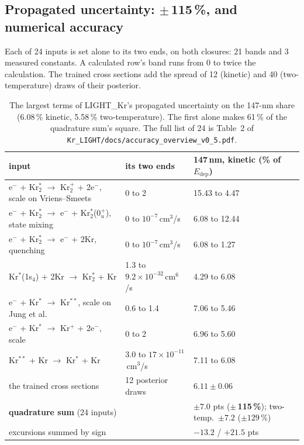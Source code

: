 \documentclass[11pt]{article}
\newcommand{\el}{\ensuremath{\mathrm{e}^-}}
\newcommand{\Krs}{Kr\ensuremath{^*}}
\newcommand{\Krpp}{Kr\ensuremath{^{**}}}
\newcommand{\Krp}{Kr\ensuremath{^+}}
\newcommand{\Krtp}{Kr\ensuremath{_2^+}}
\newcommand{\Krts}{Kr\ensuremath{_2^*}}
\newcommand{\Edep}{\ensuremath{E_\mathrm{dep}}}
\newcommand{\unc}[1]{\colorbox{hlbg}{\textbf{#1}}}
\begin{document}
\subsection{Propagated uncertainty: \unc{$\pm$\,115\,\%}, and numerical accuracy}

Each of 24 inputs is set alone to its two ends, on both closures: 21 bands
and 3 measured constants. A calculated row's band runs from 0 to twice the
calculation. The trained cross sections add the spread of 12 (kinetic) and
40 (two-temperature) draws of their posterior.

\begin{table}[H]
\small
\begin{tabularx}{\textwidth}{@{}Xll@{}}
\toprule
input & its two ends & 147\,nm, kinetic (\% of \Edep) \\
\midrule
\el{} + \Krts{} $\to$ \Krtp{} + 2\el{}, scale on Vriens--Smeets & 0 to 2 & 15.43 to 4.47 \\
\el{} + \Krts{} $\to$ \el{} + \Krts(0$_u^+$), state mixing & 0 to $10^{-7}$\,cm$^3$/s & 6.08 to 12.44 \\
\el{} + \Krts{} $\to$ \el{} + 2Kr, quenching & 0 to $10^{-7}$\,cm$^3$/s & 6.08 to 1.27 \\
\Krs(1s$_4$) + 2Kr $\to$ \Krts{} + Kr & 1.3 to $9.2\times10^{-32}$\,cm$^6$/s & 4.29 to 6.08 \\
\el{} + \Krs{} $\to$ \Krpp{}, scale on Jung et al. & 0.6 to 1.4 & 7.06 to 5.46 \\
\el{} + \Krs{} $\to$ \Krp{} + 2\el{}, scale & 0 to 2 & 6.96 to 5.60 \\
\Krpp{} + Kr $\to$ \Krs{} + Kr & 3.0 to $17\times10^{-11}$\,cm$^3$/s & 7.11 to 6.08 \\
the trained cross sections & 12 posterior draws & $6.11\pm0.06$ \\
\midrule
\textbf{quadrature sum} (24 inputs) & & $\pm 7.0$ pts (\unc{$\pm$\,115\,\%}); two-temp.\ $\pm 7.2$ ($\pm 129$\,\%) \\
excursions summed by sign & & $-13.2$ / $+21.5$ pts \\
\bottomrule
\end{tabularx}
\caption{The largest terms of LIGHT\_Kr's propagated uncertainty on the
147-nm share (6.08\,\% kinetic, 5.58\,\% two-temperature). The first alone
makes 61\,\% of the quadrature sum's square. The full list of 24 is Table~2
of \texttt{Kr\_LIGHT/docs/accuracy\_overview\_v0\_5.pdf}.}
\end{table}
\end{document}
